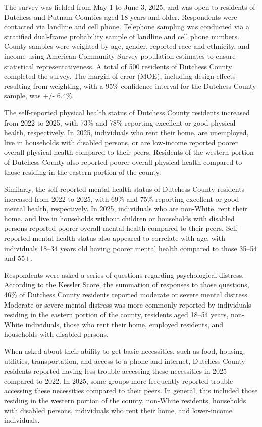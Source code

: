 \documentclass[
  english,
  letterpaper,
]{report}
\begin{document}
The survey was fielded from May 1 to June 3, 2025, and was open to
residents of Dutchess and Putnam Counties aged 18 years and older.
Respondents were contacted via landline and cell phone. Telephone
sampling was conducted via a stratified dual-frame probability sample of
landline and cell phone numbers. County samples were weighted by age,
gender, reported race and ethnicity, and income using American Community
Survey population estimates to ensure statistical representativeness. A
total of 500 residents of Dutchess County completed the survey. The
margin of error (MOE), including design effects resulting from
weighting, with a 95\% confidence interval for the Dutchess County
sample, was +/- 6.4\%.

The self-reported physical health status of Dutchess County residents
increased from 2022 to 2025, with 73\% and 78\% reporting excellent or
good physical health, respectively. In 2025, individuals who rent their
home, are unemployed, live in households with disabled persons, or are
low-income reported poorer overall physical health compared to their
peers. Residents of the western portion of Dutchess County also reported
poorer overall physical health compared to those residing in the eastern
portion of the county.

Similarly, the self-reported mental health status of Dutchess County
residents increased from 2022 to 2025, with 69\% and 75\% reporting
excellent or good mental health, respectively. In 2025, individuals who
are non-White, rent their home, and live in households without children
or households with disabled persons reported poorer overall mental
health compared to their peers. Self-reported mental health status also
appeared to correlate with age, with individuals 18--34 years old having
poorer mental health compared to those 35--54 and 55+.

Respondents were asked a series of questions regarding psychological
distress. According to the Kessler Score, the summation of responses to
those questions, 46\% of Dutchess County residents reported moderate or
severe mental distress. Moderate or severe mental distress was more
commonly reported by individuals residing in the eastern portion of the
county, residents aged 18--54 years, non-White individuals, those who
rent their home, employed residents, and households with disabled
persons.

When asked about their ability to get basic necessities, such as food,
housing, utilities, transportation, and access to a phone and internet,
Dutchess County residents reported having less trouble accessing these
necessities in 2025 compared to 2022. In 2025, some groups more
frequently reported trouble accessing these necessities compared to
their peers. In general, this included those residing in the western
portion of the county, non-White residents, households with disabled
persons, individuals who rent their home, and lower-income individuals.
\end{document}
